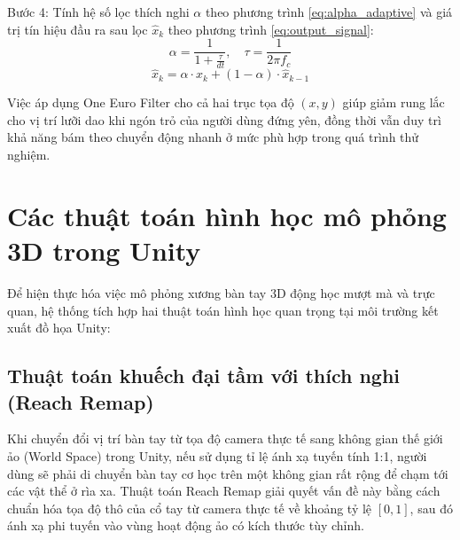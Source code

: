 \documentclass[../BTL.tex]{subfiles}
\begin{document}
Bước 4: Tính hệ số lọc thích nghi $\alpha$ theo phương trình \eqref{eq:alpha_adaptive} và giá trị tín hiệu đầu ra sau lọc $\hat{x}_k$ theo phương trình \eqref{eq:output_signal}:
\begin{equation}
\label{eq:alpha_adaptive}
\alpha = \frac{1}{1 + \frac{\tau}{dt}}, \quad \tau = \frac{1}{2\pi f_c}
\end{equation}
\begin{equation}
\label{eq:output_signal}
\hat{x}_k = \alpha \cdot x_k + (1 - \alpha) \cdot \hat{x}_{k-1}
\end{equation}

Việc áp dụng One Euro Filter cho cả hai trục tọa độ $(x, y)$ giúp giảm rung lắc cho vị trí lưỡi dao khi ngón trỏ của người dùng đứng yên, đồng thời vẫn duy trì khả năng bám theo chuyển động nhanh ở mức phù hợp trong quá trình thử nghiệm.

\section{Các thuật toán hình học mô phỏng 3D trong Unity}
\label{section:2.6}
Để hiện thực hóa việc mô phỏng xương bàn tay 3D động học mượt mà và trực quan, hệ thống tích hợp hai thuật toán hình học quan trọng tại môi trường kết xuất đồ họa Unity:

\subsection{Thuật toán khuếch đại tầm với thích nghi (Reach Remap)}
Khi chuyển đổi vị trí bàn tay từ tọa độ camera thực tế sang không gian thế giới ảo (World Space) trong Unity, nếu sử dụng tỉ lệ ánh xạ tuyến tính 1:1, người dùng sẽ phải di chuyển bàn tay cơ học trên một không gian rất rộng để chạm tới các vật thể ở rìa xa. Thuật toán Reach Remap giải quyết vấn đề này bằng cách chuẩn hóa tọa độ thô của cổ tay từ camera thực tế về khoảng tỷ lệ $[0, 1]$, sau đó ánh xạ phi tuyến vào vùng hoạt động ảo có kích thước tùy chỉnh.
\end{document}
